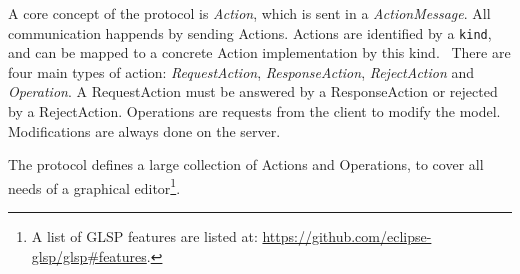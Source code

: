 A core concept of the protocol is \emph{Action}, which is sent in a \emph{ActionMessage}.
All communication happends by sending Actions.
Actions are identified by a \texttt{kind}, and can be mapped to a concrete Action implementation by this kind.~\cite{philiplangerEclipseglspGlspPROTOCOL2020}
There are four main types of action: \emph{RequestAction}, \emph{ResponseAction}, \emph{RejectAction} and \emph{Operation}.
A RequestAction must be answered by a ResponseAction or rejected by a RejectAction.
Operations are requests from the client to modify the model.
Modifications are always done on the server.~~\cite{philiplangerEclipseglspGlspPROTOCOL2020}

The protocol defines a large collection of Actions and Operations, to cover all needs of a graphical editor\footnote{A list of \gls{GLSP} features are listed at: \href{https://github.com/eclipse-glsp/glsp\#features}{https://github.com/eclipse-glsp/glsp\#features}.}.

